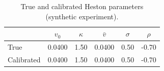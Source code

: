 \begin{table}[h!]
\centering
\begin{tabular}{lccccc}
\hline
 & $v_0$ & $\kappa$ & $\bar{v}$ & $\sigma$ & $\rho$ \\
\hline
True       & 0.0400 & 1.50 & 0.0400 & 0.50 & -0.70 \\
Calibrated & 0.0400 & 1.50 & 0.0400 & 0.50 & -0.70 \\
\hline
\end{tabular}
\caption{True and calibrated Heston parameters (synthetic experiment).}
\label{tab:true_vs_cal}
\end{table}
